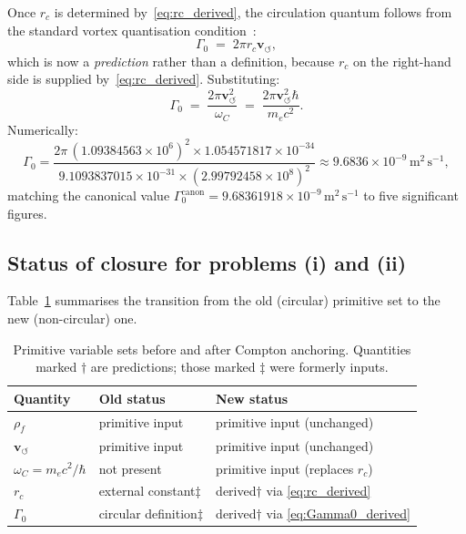 \documentclass[11pt,a4paper]{article}
\newcommand{\rc}{r_c}
\newcommand{\vswirl}{\mathbf{v}_{\scriptscriptstyle\boldsymbol{\circlearrowleft}}}
\newcommand{\rhof}{\rho_{\!f}}
\newcommand{\GammaZ}{\Gamma_0}
\newcommand{\omC}{\omega_C}
\begin{document}
Once $\rc$ is determined by~\eqref{eq:rc_derived}, the circulation
quantum follows from the standard vortex quantisation
condition~\cite{Donnelly1991,Feynman1955}:
\begin{equation}
  \GammaZ \;=\; 2\pi\rc\vswirl,
  \label{eq:Gamma0_ring}
\end{equation}
which is now a \emph{prediction} rather than a definition, because
$\rc$ on the right-hand side is supplied
by~\eqref{eq:rc_derived}.  Substituting:
\begin{equation}
  \boxed{
    \GammaZ \;=\; \frac{2\pi\vswirl^2}{\omC}
    \;=\; \frac{2\pi\vswirl^2\hbar}{m_e c^2}.
  }
  \label{eq:Gamma0_derived}
\end{equation}
Numerically:
\begin{equation}
  \GammaZ
  = \frac{2\pi\,(1.09384563\times10^6)^2
          \times 1.054571817\times10^{-34}}
         {9.1093837015\times10^{-31}
          \times(2.99792458\times10^8)^2}
  \approx 9.6836\times10^{-9}\,\mathrm{m^2\,s^{-1}},
\end{equation}
matching the canonical value $\GammaZ^{\mathrm{canon}}
=9.68361918\times10^{-9}\,\mathrm{m^2\,s^{-1}}$ to five significant
figures.

\subsection{Status of closure for problems (i) and (ii)}

Table~\ref{tab:closure} summarises the transition from the old
(circular) primitive set to the new (non-circular) one.

\begin{table}[h]
\centering
\caption{Primitive variable sets before and after Compton anchoring.
  Quantities marked $\dagger$ are predictions; those marked
  $\ddagger$ were formerly inputs.}
\label{tab:closure}
\begin{tabular}{lll}
  \toprule
  Quantity & Old status & New status \\
  \midrule
  $\rhof$    & primitive input          & primitive input (unchanged) \\
  $\vswirl$  & primitive input          & primitive input (unchanged) \\
  $\omC = m_e c^2/\hbar$ & not present  & primitive input (replaces $\rc$) \\
  $\rc$      & external constant$\ddagger$ & derived$\dagger$ via \eqref{eq:rc_derived} \\
  $\GammaZ$  & circular definition$\ddagger$ & derived$\dagger$ via \eqref{eq:Gamma0_derived} \\
  \bottomrule
\end{tabular}
\end{table}
\end{document}
